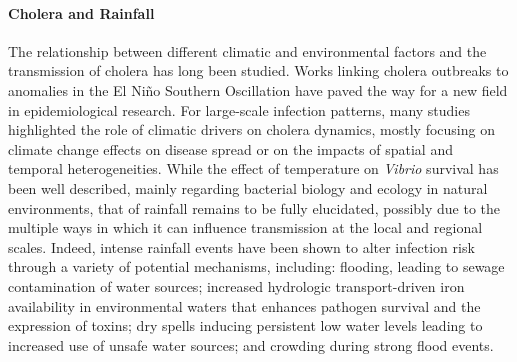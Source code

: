 \paragraph{Cholera and Rainfall} The relationship between different climatic and environmental factors and the transmission of cholera  has long been studied. Works linking cholera outbreaks to anomalies in the El Niño Southern Oscillation  have paved the way for a new field in epidemiological research. For large-scale infection patterns, many studies highlighted the role of climatic drivers on cholera dynamics, mostly focusing on climate change effects on disease spread or on the impacts of spatial and temporal heterogeneities. While the effect of temperature on \textit{Vibrio} survival has been well described, mainly regarding bacterial biology and ecology in natural environments, that of rainfall remains to be fully elucidated, possibly due to the multiple ways in which it can influence transmission at the local and regional scales. Indeed, intense rainfall events have been shown to alter infection risk through a variety of potential mechanisms, including: flooding, leading to sewage contamination of water sources; increased hydrologic transport-driven iron availability in environmental waters that enhances pathogen survival and the expression of toxins; dry spells inducing persistent low water levels leading to increased use of unsafe water sources; and crowding during strong flood events.

